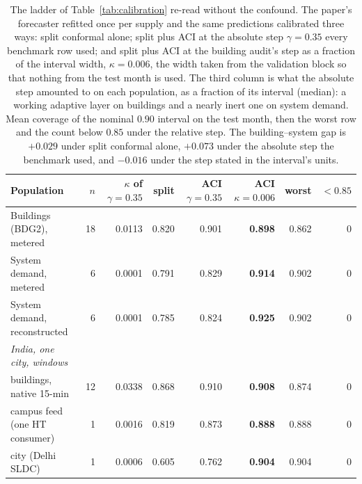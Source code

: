 \begin{table}[t]
\centering
\footnotesize
\setlength{\tabcolsep}{3.5pt}
\begin{tabular}{lrrrrrrr}
\toprule
Population & $n$ & $\kappa$ of $\gamma{=}0.35$ & split & ACI $\gamma{=}0.35$ & ACI $\kappa{=}0.006$ & worst & $<0.85$ \\
\midrule
Buildings (BDG2), metered & 18 & 0.0113 & 0.820 & 0.901 & \textbf{0.898} & 0.862 & 0 \\
System demand, metered & 6 & 0.0001 & 0.791 & 0.829 & \textbf{0.914} & 0.902 & 0 \\
System demand, reconstructed & 6 & 0.0001 & 0.785 & 0.824 & \textbf{0.925} & 0.902 & 0 \\
\midrule
\emph{India, one city, windows} &  &  &  &  &  &  &  \\
\quad buildings, native 15-min & 12 & 0.0338 & 0.868 & 0.910 & \textbf{0.908} & 0.874 & 0 \\
\quad campus feed (one HT consumer) & 1 & 0.0016 & 0.819 & 0.873 & \textbf{0.888} & 0.888 & 0 \\
\quad city (Delhi SLDC) & 1 & 0.0006 & 0.605 & 0.762 & \textbf{0.904} & 0.904 & 0 \\
\bottomrule
\end{tabular}
\caption{The ladder of Table~\ref{tab:calibration} re-read without the confound. The paper's forecaster refitted once per supply and the same predictions calibrated three ways: split conformal alone; split plus ACI at the absolute step $\gamma=0.35$ every benchmark row used; and split plus ACI at the building audit's step as a fraction of the interval width, $\kappa=0.006$, the width taken from the validation block so that nothing from the test month is used. The third column is what the absolute step amounted to on each population, as a fraction of its interval (median): a working adaptive layer on buildings and a nearly inert one on system demand. Mean coverage of the nominal $0.90$ interval on the test month, then the worst row and the count below $0.85$ under the relative step. The building--system gap is $+0.029$ under split conformal alone, $+0.073$ under the absolute step the benchmark used, and $-0.016$ under the step stated in the interval's units.}
\label{tab:aci-step}
\end{table}
